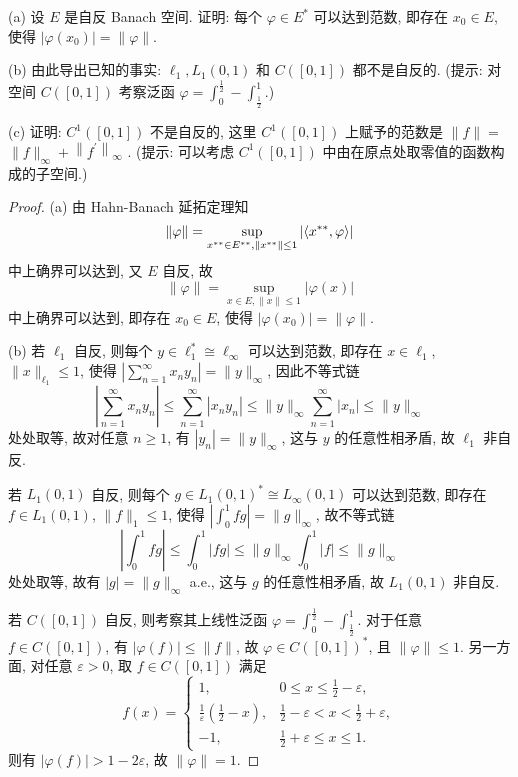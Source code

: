\begin{exercise}[12]
    (a) 设 $E$ 是自反 Banach 空间. 证明: 每个 $\varphi \in E^{*}$ 可以达到范数, 
    即存在 $x_{0} \in E$, 使得 $\left|\varphi\left(x_{0}\right)\right|=\|\varphi\|$.
    
    (b) 由此导出已知的事实: $\ell_{1}, L_{1}(0,1)$ 和 $C([0,1])$ 都不是自反的. 
    (提示: 对空间 $C([0,1])$ 考察泛函 $\varphi=\int_{0}^{\frac{1}{2}}-\int_{\frac{1}{2}}^{1}$.)

    (c) 证明: $C^{1}([0,1])$ 不是自反的, 
    这里 $C^{1}([0,1])$ 上赋予的范数是 $\|f\|=$ $\|f\|_{\infty}+\left\|f^{\prime}\right\|_{\infty}$ .
    (提示: 可以考虑 $C^{1}([0,1])$ 中由在原点处取零值的函数构成的子空间.)
\end{exercise}

\begin{proof}
    (a) 由 Hahn-Banach 延拓定理知
    \[\|\varphi\|=\sup_{x^{**}\in E^{**},\|x^{**}\|\leq 1}|\langle x^{**},\varphi\rangle|\]
    中上确界可以达到, 又 $E$ 自反, 故
    \[\|\varphi\|=\sup_{x\in E,\|x\|\leq 1}|\varphi(x)|\]
    中上确界可以达到, 即存在 $x_0\in E$, 使得 $|\varphi(x_0)|=\|\varphi\|$.

    (b) 若 $\ell_1$ 自反, 则每个 $y\in\ell_1^*\cong\ell_{\infty}$ 可以达到范数,
    即存在 $x\in\ell_1$, $\|x\|_{\ell_1}\leq 1$, 使得 $|\sum_{n=1}^{\infty}x_ny_n|=\|y\|_{\infty}$, 因此不等式链
    \[\left|\sum_{n=1}^{\infty}x_ny_n\right|\leq\sum_{n=1}^{\infty}|x_ny_n|\leq\|y\|_{\infty}\sum_{n=1}^{\infty}|x_n|\leq\|y\|_{\infty}\]
    处处取等, 故对任意 $n\geq 1$, 有 $|y_n|=\|y\|_{\infty}$, 这与 $y$ 的任意性相矛盾, 故 $\ell_1$ 非自反.

    若 $L_1(0,1)$ 自反, 则每个 $g\in L_1(0,1)^*\cong L_{\infty}(0,1)$ 可以达到范数,
    即存在 $f\in L_1(0,1)$, $\|f\|_1\leq 1$, 使得 $|\int_0^1 fg|=\|g\|_{\infty}$, 故不等式链
    \[\left|\int_0^1 fg\right|\leq\int_0^1 |fg|\leq\|g\|_{\infty}\int_0^1 |f|\leq\|g\|_{\infty}\]
    处处取等, 故有 $|g|=\|g\|_{\infty}$ a.e., 这与 $g$ 的任意性相矛盾, 故 $L_1(0,1)$ 非自反.

    若 $C([0,1])$ 自反, 则考察其上线性泛函 $\varphi=\int_0^{\frac{1}{2}}-\int_{\frac{1}{2}}^1$.
    对于任意 $f\in C([0,1])$, 有 $|\varphi(f)|\leq\|f\|$, 故 $\varphi\in C([0,1])^*$, 且 $\|\varphi\|\leq 1$.
    另一方面, 对任意 $\varepsilon>0$, 取 $f\in C([0,1])$ 满足
    \[f(x)=\begin{cases}
        1, & 0\leq x\leq\frac{1}{2}-\varepsilon, \\
        \frac{1}{\varepsilon}\left(\frac{1}{2}-x\right), & \frac{1}{2}-\varepsilon<x<\frac{1}{2}+\varepsilon, \\
        -1, & \frac{1}{2}+\varepsilon\leq x\leq 1.
    \end{cases}\]
    则有 $|\varphi(f)|>1-2\varepsilon$, 故 $\|\varphi\|=1$.


\end{proof}
